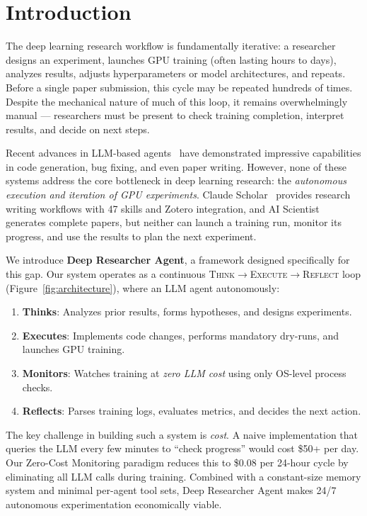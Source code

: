 \section{Introduction}
\label{sec:intro}

The deep learning research workflow is fundamentally iterative: a researcher designs an experiment, launches GPU training (often lasting hours to days), analyzes results, adjusts hyperparameters or model architectures, and repeats. Before a single paper submission, this cycle may be repeated hundreds of times. Despite the mechanical nature of much of this loop, it remains overwhelmingly manual --- researchers must be present to check training completion, interpret results, and decide on next steps.

Recent advances in LLM-based agents~\cite{openhands,swe-agent,ai-scientist} have demonstrated impressive capabilities in code generation, bug fixing, and even paper writing. However, none of these systems address the core bottleneck in deep learning research: the \textit{autonomous execution and iteration of GPU experiments}. Claude Scholar~\cite{claude-scholar} provides research writing workflows with 47 skills and Zotero integration, and AI Scientist~\cite{ai-scientist} generates complete papers, but neither can launch a training run, monitor its progress, and use the results to plan the next experiment.

We introduce \textbf{Deep Researcher Agent}, a framework designed specifically for this gap. Our system operates as a continuous \textsc{Think}$\rightarrow$\textsc{Execute}$\rightarrow$\textsc{Reflect} loop (Figure~\ref{fig:architecture}), where an LLM agent autonomously:

\begin{enumerate}[nosep]
    \item \textbf{Thinks}: Analyzes prior results, forms hypotheses, and designs experiments.
    \item \textbf{Executes}: Implements code changes, performs mandatory dry-runs, and launches GPU training.
    \item \textbf{Monitors}: Watches training at \textit{zero LLM cost} using only OS-level process checks.
    \item \textbf{Reflects}: Parses training logs, evaluates metrics, and decides the next action.
\end{enumerate}

The key challenge in building such a system is \textit{cost}. A naive implementation that queries the LLM every few minutes to ``check progress'' would cost \$50+ per day. Our Zero-Cost Monitoring paradigm reduces this to \$0.08 per 24-hour cycle by eliminating all LLM calls during training. Combined with a constant-size memory system and minimal per-agent tool sets, Deep Researcher Agent makes 24/7 autonomous experimentation economically viable.

